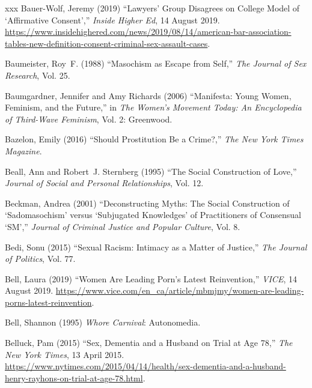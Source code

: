 \documentclass[]{jlreq} \usepackage{mystyle}
\begin{document}
\begin{thebibliography}{xxx}
Bauer-Wolf, Jeremy (2019) ``Lawyers' Group Disagrees on College Model of
  `Affirmative Consent','' \emph{Inside Higher Ed}, 14 August 2019.
  \url{https://www.insidehighered.com/news/2019/08/14/american-bar-association-tables-new-definition-consent-criminal-sex-assault-cases}.

Baumeister, Roy~F. (1988) ``Masochism as Escape from Self,'' \textit{ The
  Journal of Sex Research}, Vol. 25.

Baumgardner, Jennifer and Amy Richards (2006) ``Manifesta: Young Women,
  Feminism, and the Future,'' in  \textit{ The Women's Movement Today: An
  Encyclopedia of Third-Wave Feminism}, Vol. 2: Greenwood.

Bazelon, Emily (2016) ``Should Prostitution Be a Crime?,'' \emph{The New York
  Times Magazine}.

Beall, Ann and Robert~J. Sternberg (1995) ``The Social Construction of Love,''
  \textit{ Journal of Social and Personal Relationships}, Vol. 12.

Beckman, Andrea (2001) ``Deconstructing Myths: The Social Construction of
  `Sadomasochism' versus `Subjugated Knowledges' of Practitioners of Consensual
  `SM','' \textit{ Journal of Criminal Justice and Popular Culture}, Vol. 8.

Bedi, Sonu (2015) ``Sexual Racism: Intimacy as a Matter of Justice,'' \textit{
  The Journal of Politics}, Vol. 77.

Bell, Laura (2019) ``Women Are Leading Porn's Latest Reinvention,''
  \emph{VICE}, 14 August 2019.
  \url{https://www.vice.com/en_ca/article/mbmjmy/women-are-leading-porns-latest-reinvention}.

Bell, Shannon (1995)  \textit{ Whore Carnival}: Autonomedia.

Belluck, Pam (2015) ``Sex, Dementia and a Husband on Trial at Age 78,''
  \emph{The New York Times}, 13 April 2015.
  \url{https://www.nytimes.com/2015/04/14/health/sex-dementia-and-a-husband-henry-rayhons-on-trial-at-age-78.html}.


\end{thebibliography}
\end{document}
